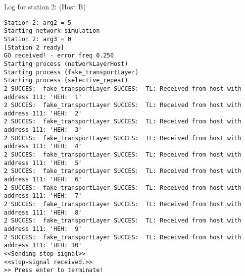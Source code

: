 Log for station 2: (Host B)
\begin{lstlisting}[breaklines=true]
Station 2: arg2 = 5
Starting network simulation
Station 2: arg3 = 0
[Station 2 ready]
GO received! - error freq 0.250
Starting process (networkLayerHost)
Starting process (fake_transportLayer)
Starting process (selective_repeat)
2 SUCCES:  fake_transportLayer SUCCES:  TL: Received from host with address 111: 'HEH:  1'
2 SUCCES:  fake_transportLayer SUCCES:  TL: Received from host with address 111: 'HEH:  2'
2 SUCCES:  fake_transportLayer SUCCES:  TL: Received from host with address 111: 'HEH:  3'
2 SUCCES:  fake_transportLayer SUCCES:  TL: Received from host with address 111: 'HEH:  4'
2 SUCCES:  fake_transportLayer SUCCES:  TL: Received from host with address 111: 'HEH:  5'
2 SUCCES:  fake_transportLayer SUCCES:  TL: Received from host with address 111: 'HEH:  6'
2 SUCCES:  fake_transportLayer SUCCES:  TL: Received from host with address 111: 'HEH:  7'
2 SUCCES:  fake_transportLayer SUCCES:  TL: Received from host with address 111: 'HEH:  8'
2 SUCCES:  fake_transportLayer SUCCES:  TL: Received from host with address 111: 'HEH:  9'
2 SUCCES:  fake_transportLayer SUCCES:  TL: Received from host with address 111: 'HEH: 10'
<<Sending stop-signal>>
<<stop-signal received.>>
>> Press enter to terminate!
\end{lstlisting}




















